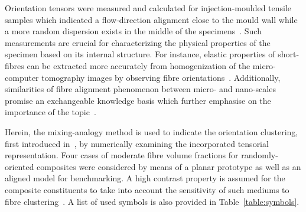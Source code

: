 	Orientation tensors were measured and calculated for injection-moulded tensile samples which indicated a flow-direction alignment close to the mould wall while a more random dispersion exists in the middle of the specimens~\autocite{Lee.2003}. Such measurements are crucial for characterizing the physical properties of the specimen based on its internal structure. For instance, elastic properties of short-fibres can be extracted more accurately from homogenization of the micro-computer tomography images by observing fibre orientations~\autocite{Muller.2015}. Additionally, similarities of fibre alignment phenomenon between micro- and nano-scales promise an exchangeable knowledge basis which further emphasise on the importance of the topic~\autocite{Fan.2005,Yang.2010}.
	
	Herein, the mixing-analogy method is used to indicate the orientation clustering, first introduced in~\autocite{Ranganathan.1990}, by numerically examining the incorporated tensorial representation. Four cases of moderate fibre volume fractions for randomly-oriented composites were considered by means of a planar prototype as well as an aligned model for benchmarking. A high contrast property is assumed for the composite constituents to take into account the sensitivity of such mediums to fibre clustering~\autocite{Kataoka.2000}. A list of used symbols is also provided in Table~\ref{table:symbols}.
